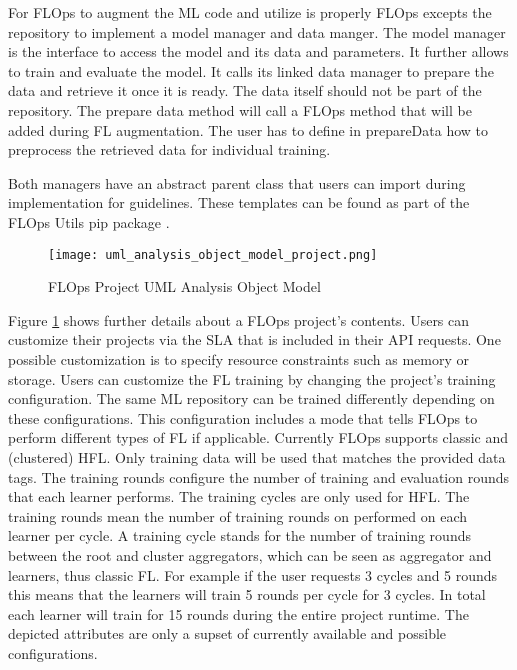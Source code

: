For FLOps to augment the ML code and utilize is properly FLOps excepts the repository to implement a model manager and data manger.
The model manager is the interface to access the model and its data and parameters.
It further allows to train and evaluate the model.
It calls its linked data manager to prepare the data and retrieve it once it is ready.
The data itself should not be part of the repository.
The prepare data method will call a FLOps method that will be added during FL augmentation.
The user has to define in prepareData how to preprocess the retrieved data for individual training.

Both managers have an abstract parent class that users can import during implementation for guidelines.
These templates can be found as part of the FLOps Utils pip package \cite{flops_utils_pip}.

\begin{figure}[h]
    \centering
    \texttt{[image: uml\_analysis\_object\_model\_project.png]}
    \caption{FLOps Project UML Analysis Object Model}
    \label{fig:uml_project_analysis_object_model}
\end{figure}

Figure \ref{fig:uml_project_analysis_object_model} shows further details about a FLOps project's contents.
Users can customize their projects via the SLA that is included in their API requests.
One possible customization is to specify resource constraints such as memory or storage.
Users can customize the FL training by changing the project's training configuration.
The same ML repository can be trained differently depending on these configurations.
This configuration includes a mode that tells FLOps to perform different types of FL if applicable.
Currently FLOps supports classic and (clustered) HFL.
Only training data will be used that matches the provided data tags.
The training rounds configure the number of training and evaluation rounds that each learner performs.
The training cycles are only used for HFL.
The training rounds mean the number of training rounds on performed on each learner per cycle.
A training cycle stands for the number of training rounds between the root and cluster aggregators, which can be seen as aggregator and learners, thus classic FL.
For example if the user requests 3 cycles and 5 rounds this means that the learners will train 5 rounds per cycle for 3 cycles.
In total each learner will train for 15 rounds during the entire project runtime.
The depicted attributes are only a supset of currently available and possible configurations.

